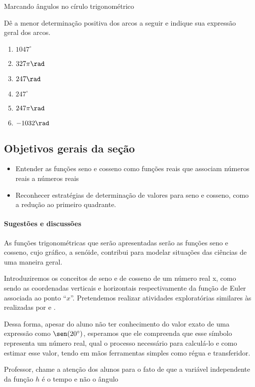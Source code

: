 \begin{task}{Marcando ângulos no círulo trigonométrico}
\label{trig-ativ14}

Dê a menor determinação positiva dos arcos a seguir e indique sua expressão geral dos arcos.
\begin{enumerate}
\item $1047^{\circ}$
\item $327\pi\rad$
\item $247\rad$
\item $247^{\circ}$
\item $247\pi\rad$
\item $-1032\rad$
\end{enumerate}
\end{task}

\cleardoublepage
\def\currentcolor{session1}
\begin{texto}
{
	\subsection{Objetivos gerais da seção}

	\begin{itemize}
	\item  Entender as funções seno e cosseno como funções reais que 	associam números reais a números reais
	\item Reconhecer estratégias de determinação de valores para 	seno e cosseno, como a redução ao primeiro quadrante.
	\end{itemize}

	\paragraph{Sugestões e discussões}

	As funções trigonométricas que serão apresentadas serão as funções seno e cosseno, cujo gráfico, a senóide, contribui para modelar situações das ciências de uma maneira geral. 

	Introduziremos os conceitos de seno e de cosseno de um número real x, como sendo as coordenadas verticais e horizontais respectivamente da função de Euler associada ao ponto “$x$”. Pretendemos realizar atividades exploratórias similares às realizadas por \cite{weber2005} e \cite{costa2017}.

	Dessa forma, apesar do aluno não ter conhecimento do valor exato de uma expressão como $\sen(20^{\circ})$, esperamos que ele compreenda que esse símbolo representa um número real, qual o processo necessário para calculá-lo e como estimar esse valor, tendo em mãos ferramentas simples como régua e transferidor. 

	Professor, chame a atenção dos alunos para o fato de que a variável independente da função $h$ é o tempo e não o ângulo
}	
\end{texto}
